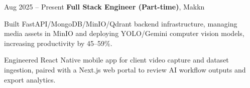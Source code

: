 \begin{twocolentry}{
            Aug 2025 – Present
        }
\textbf{Full Stack Engineer (Part-time)}, Makkn\end{twocolentry}

\vspace{0.10 cm}
\begin{onecolentry}
    \begin{highlights}
        \item Built FastAPI/MongoDB/MinIO/Qdrant backend infrastructure, managing media assets in MinIO and deploying YOLO/Gemini computer vision models, increasing productivity by 45--59\%.
        \item Engineered React Native mobile app for client video capture and dataset ingestion, paired with a Next.js web portal to review AI workflow outputs and export analytics.
    \end{highlights}
\end{onecolentry}
